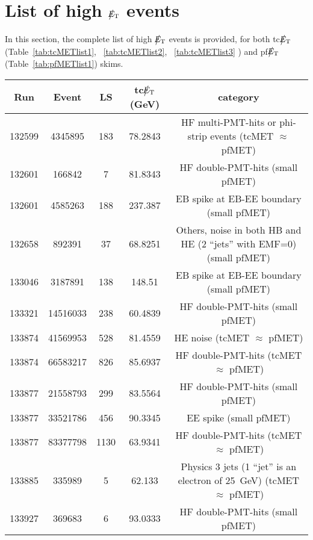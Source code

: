 \section{List of high $\big\slash\hspace{-1.6ex}{E_\text{T}}$ events}

In this section, the complete list of high $\big\slash\hspace{-1.6ex}{E_\text{T}}$ events is provided, for both tc$\big\slash\hspace{-1.6ex}{E_\text{T}}$ 
(Table~\ref{tab:tcMETlist1}, ~\ref{tab:tcMETlist2}, ~\ref{tab:tcMETlist3} ) and pf$\big\slash\hspace{-1.6ex}{E_\text{T}}$ 
(Table~\ref{tab:pfMETlist1}) skims.


\begin{table}[htbp]
  \begin{center}
    \begin{tabular}{|c|c|c|c|c|}
      \hline
      Run & Event & LS & tc$\big\slash\hspace{-1.6ex}{E_\text{T}}$ (GeV) & category \\     
      \hline
      132599 & 4345895     & 183  &    78.2843  & HF multi-PMT-hits or phi-strip events (tcMET $\approx$ pfMET) \\
      132601 & 166842      & 7    &    81.8343  & HF double-PMT-hits  (small pfMET) \\
      132601 & 4585263     & 188  &    237.387  & EB spike at EB-EE boundary (small pfMET) \\
      132658 & 892391      & 37   &    68.8251  & Others, noise in both HB and HE (2 ``jets'' with EMF=0) (small pfMET) \\
      133046 & 3187891     & 138  &    148.51   & EB spike at EB-EE boundary (small pfMET) \\
      133321 & 14516033    & 238  &    60.4839  & HF double-PMT-hits  (small pfMET) \\
      133874 & 41569953    & 528  &    81.4559  & HE noise (tcMET $\approx$ pfMET) \\
      133874 & 66583217    & 826  &    85.6937  & HF double-PMT-hits  (tcMET $\approx$ pfMET) \\
      133877 & 21558793    & 299  &    83.5564  & HF double-PMT-hits  (small pfMET) \\
      133877 & 33521786    & 456  &    90.3345  & EE spike (small pfMET) \\
      133877 & 83377798    & 1130 &    63.9341  & HF double-PMT-hits  (tcMET $\approx$ pfMET) \\
      133885 & 335989      & 5    &    62.133   & Physics 3 jets (1 ``jet'' is an electron of 25~GeV) (tcMET $\approx$ pfMET) \\
      133927 & 369683      & 6    &    93.0333  & HF double-PMT-hits  (small pfMET) \\

\end{tabular}
\end{center}
\end{table}
